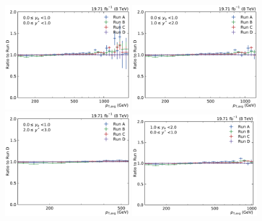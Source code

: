 \begin{figure}[htbp]
    \centering
    \includegraphics[width=0.49\textwidth]{figures/measurement/run_comparison_yb0ys0.pdf}\hfill
    \includegraphics[width=0.49\textwidth]{figures/measurement/run_comparison_yb0ys1.pdf}
    \includegraphics[width=0.49\textwidth]{figures/measurement/run_comparison_yb0ys2.pdf}\hfill
    \includegraphics[width=0.49\textwidth]{figures/measurement/run_comparison_yb1ys0.pdf}

\end{figure}
